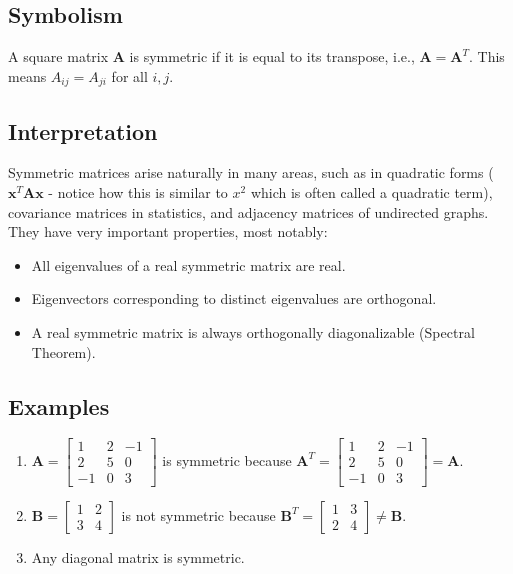 \documentclass{article}
\newcommand{\vect}[1]{\bm{#1}} %
\newcommand{\mat}[1]{\bm{#1}}  %
\begin{document}
\subsection*{Symbolism}
A square matrix $\mat{A}$ is symmetric if it is equal to its transpose, i.e., $\mat{A} = \mat{A}^T$. This means $A_{ij} = A_{ji}$ for all $i, j$.

\subsection*{Interpretation}
Symmetric matrices arise naturally in many areas, such as in quadratic forms ($\vect{x}^T \mat{A} \vect{x}$ - notice how this is similar to $x^{2}$ which is often called a quadratic term), covariance matrices in statistics, and adjacency matrices of undirected graphs. They have very important properties, most notably:
\begin{itemize}
    \item All eigenvalues of a real symmetric matrix are real.
    \item Eigenvectors corresponding to distinct eigenvalues are orthogonal.
    \item A real symmetric matrix is always orthogonally diagonalizable (Spectral Theorem).
\end{itemize}

\subsection*{Examples}
\begin{enumerate}
    \item $\mat{A} = \begin{bmatrix} 1 & 2 & -1 \\ 2 & 5 & 0 \\ -1 & 0 & 3 \end{bmatrix}$ is symmetric because $\mat{A}^T = \begin{bmatrix} 1 & 2 & -1 \\ 2 & 5 & 0 \\ -1 & 0 & 3 \end{bmatrix} = \mat{A}$.
    \item $\mat{B} = \begin{bmatrix} 1 & 2 \\ 3 & 4 \end{bmatrix}$ is not symmetric because $\mat{B}^T = \begin{bmatrix} 1 & 3 \\ 2 & 4 \end{bmatrix} \neq \mat{B}$.
    \item Any diagonal matrix is symmetric.
\end{enumerate}
\end{document}
